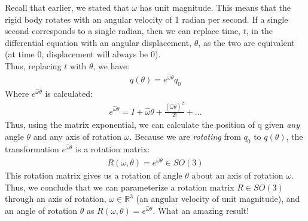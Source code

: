\documentclass[oneside]{book}
\begin{document}
Recall that earlier, we stated that $\omega$ has unit magnitude. This means that the rigid body rotates with an angular velocity of 1 radian per second. If a single second corresponds to a single radian, then we can replace time, $t$, in the differential equation with an angular displacement, $\theta$, as the two are equivalent (at time 0, displacement will always be 0).\\
Thus, replacing $t$ with $\theta$, we have:
\begin{align}
    q(\theta) = e^{\hat\omega \theta}q_0
\end{align}
Where $e^{\hat\omega \theta}$ is calculated:
\begin{align}
    e^{\hat\omega \theta} = I + \hat\omega \theta + \frac{(\hat\omega \theta)^2}{2!} + ...
\end{align}
Thus, using the matrix exponential, we can calculate the position of q given \textit{any} angle $\theta$ and any axis of rotation $\omega$. Because we are \textit{rotating} from $q_0$ to $q(\theta)$, the transformation $e^{\hat\omega \theta}$ is a rotation matrix:
\begin{align}
    R(\omega, \theta) = e^{\hat\omega \theta} \in SO(3)
\end{align}
This rotation matrix gives us a rotation of angle $\theta$ about an axis of rotation $\omega$.\\
Thus, we conclude that we can parameterize a rotation matrix $R\in SO(3)$ through an axis of rotation, $\omega \in \mathbb{R}^3$ (an angular velocity of unit magnitude), and an angle of rotation $\theta$ as $R(\omega, \theta) = e^{\hat\omega\theta}$. What an amazing result!
\end{document}
